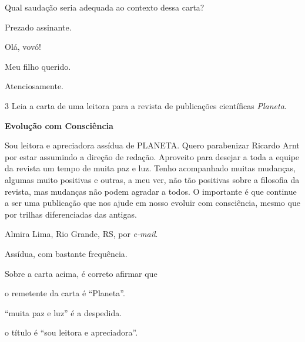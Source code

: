 \begin{conteudo}
\begin{conteudo}
\pagebreak
Qual saudação seria adequada ao contexto dessa carta?

\begin{escolha}
\item Prezado assinante.

\item Olá, vovó!

\item Meu filho querido.

\item Atenciosamente.
\end{escolha}

\num{3} Leia a carta de uma leitora para a revista de publicações
científicas \textit{Planeta}.


\begin{myquote}
\textbf{Evolução com Consciência}

Sou leitora e apreciadora assídua de PLANETA. Quero parabenizar Ricardo
Arnt por estar assumindo a direção de redação. Aproveito para desejar a
toda a equipe da revista um tempo de muita paz e luz. Tenho acompanhado
muitas mudanças, algumas muito positivas e outras, a meu ver, não tão
positivas sobre a filosofia da revista, mas mudanças não podem agradar a
todos. O importante é que continue a ser uma publicação que nos ajude em
nosso evoluir com consciência, mesmo que por trilhas diferenciadas das
antigas.

\begin{flushright}
Almira Lima, Rio Grande, RS, por \emph{e-mail}.
\end{flushright}


\begin{small}
 Assídua, com bastante frequência.
\end{small}
\end{myquote}

Sobre a carta acima, é correto afirmar que 

\begin{escolha}
\item o remetente da carta é ``Planeta''.

\item ``muita paz e luz'' é a despedida.

\item o título é ``sou leitora e apreciadora''.


\end{escolha}
\end{conteudo}
\end{conteudo}
